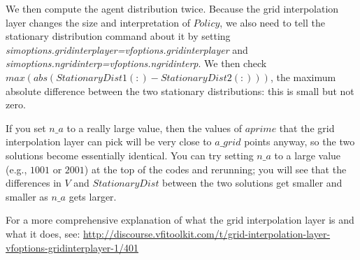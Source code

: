We then compute the agent distribution twice. Because the grid interpolation layer changes the size and interpretation of $Policy$, we also need to tell the stationary distribution command about it by setting \textit{simoptions.gridinterplayer=vfoptions.gridinterplayer} and \textit{simoptions.ngridinterp=vfoptions.ngridinterp}. We then check $max(abs(StationaryDist1(:)-StationaryDist2(:)))$, the maximum absolute difference between the two stationary distributions: this is small but not zero.

If you set $n\_{}a$ to a really large value, then the values of $aprime$ that the grid interpolation layer can pick will be very close to $a\_{}grid$ points anyway, so the two solutions become essentially identical. You can try setting $n\_{}a$ to a large value (e.g., $1001$ or $2001$) at the top of the codes and rerunning; you will see that the differences in $V$ and $StationaryDist$ between the two solutions get smaller and smaller as $n\_{}a$ gets larger.

For a more comprehensive explanation of what the grid interpolation layer is and what it does, see:
\href{http://discourse.vfitoolkit.com/t/grid-interpolation-layer-vfoptions-gridinterplayer-1/401}{http://discourse.vfitoolkit.com/t/grid-interpolation-layer-vfoptions-gridinterplayer-1/401}
